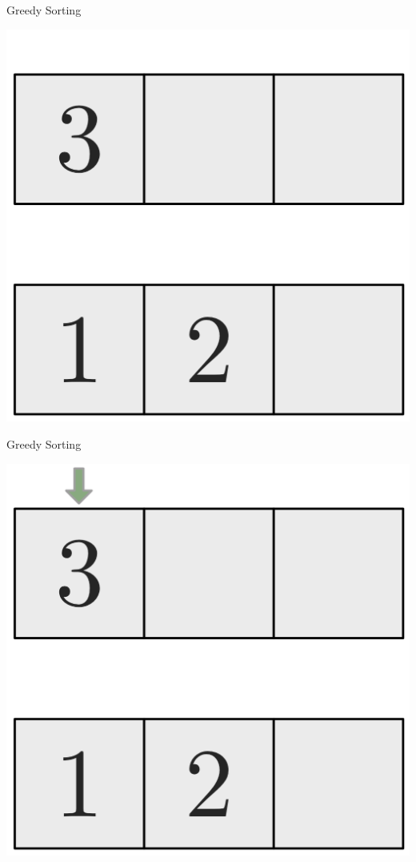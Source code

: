 \documentclass[10pt]{beamer}
\begin{document}
\begin{frame}[fragile]{Greedy Sorting}
    \begin{center}
        \includegraphics[height=.4\textheight]{Images/Bubblesort/Bubblesort_09}
    \end{center}
\end{frame}

\begin{frame}[fragile]{Greedy Sorting}
    \begin{center}
        \includegraphics[height=.4\textheight]{Images/Bubblesort/Bubblesort_10}
    \end{center}
\end{frame}
\end{document}
